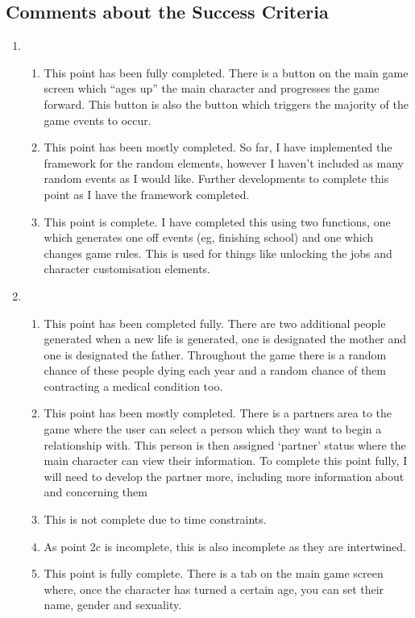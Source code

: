 \subsection{Comments about the Success Criteria}
\begin{enumerate}
    \item \begin{enumerate}
            \item This point has been fully completed. There is a button on the main game screen which “ages up” the main character and progresses the game forward. This button is also the button which triggers the majority of the game events to occur.
            \item This point has been mostly completed. So far, I have implemented the framework for the random elements, however I haven't included as many random events as I would like. Further developments to complete this point as I have the framework completed.
            \item This point is complete. I have completed this using two functions, one which generates one off events (eg, finishing school) and one which changes game rules. This is used for things like unlocking the jobs and character customisation elements.
        \end{enumerate}
        \item \begin{enumerate}
            \item This point has been completed fully. There are two additional people generated when a new life is generated, one is designated the mother and one is designated the father. Throughout the game there is a random chance of these people dying each year and a random chance of them contracting a medical condition too.
            \item This point has been mostly completed. There is a partners area to the game where the user can select a person which they want to begin a relationship with. This person is then assigned ‘partner’ status where the main character can view their information. To complete this point fully, I will need to develop the partner more, including more information about and concerning them
            \item This is not complete due to time constraints.
            \item As point 2c is incomplete, this is also incomplete as they are intertwined.
            \item This point is fully complete. There is a tab on the main game screen where, once the character has turned a certain age, you can set their name, gender and sexuality.

\end{enumerate}
\end{enumerate}
